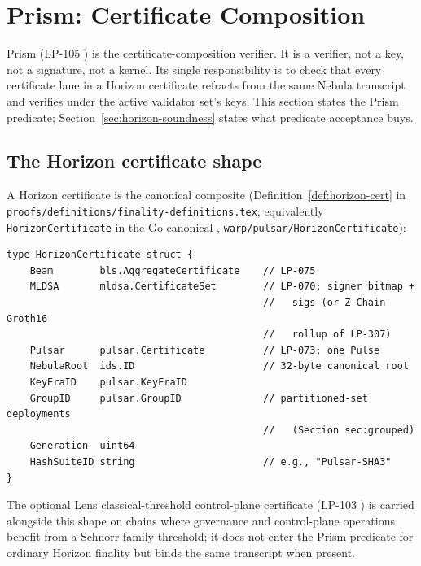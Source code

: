 \section{Prism: Certificate Composition}
\label{sec:prism-composition}

Prism (LP-105 \cite{lp105}) is the certificate-composition verifier. It is a verifier, not a key, not a signature, not a kernel. Its single responsibility is to check that every certificate lane in a Horizon certificate refracts from the same Nebula transcript and verifies under the active validator set's keys. This section states the Prism predicate; Section~\ref{sec:horizon-soundness} states what predicate acceptance buys.

\subsection{The Horizon certificate shape}

A Horizon certificate is the canonical composite (Definition~\ref{def:horizon-cert} in \texttt{proofs/definitions/finality-definitions.tex}; equivalently \texttt{HorizonCertificate} in the Go canonical \cite{consensusgo}, \texttt{warp/pulsar/HorizonCertificate}):

\begin{verbatim}
type HorizonCertificate struct {
    Beam        bls.AggregateCertificate    // LP-075
    MLDSA       mldsa.CertificateSet        // LP-070; signer bitmap +
                                            //   sigs (or Z-Chain Groth16
                                            //   rollup of LP-307)
    Pulsar      pulsar.Certificate          // LP-073; one Pulse
    NebulaRoot  ids.ID                      // 32-byte canonical root
    KeyEraID    pulsar.KeyEraID
    GroupID     pulsar.GroupID              // partitioned-set deployments
                                            //   (Section sec:grouped)
    Generation  uint64
    HashSuiteID string                      // e.g., "Pulsar-SHA3"
}
\end{verbatim}

The optional Lens classical-threshold control-plane certificate (LP-103 \cite{lp103}) is carried alongside this shape on chains where governance and control-plane operations benefit from a Schnorr-family threshold; it does not enter the Prism predicate for ordinary Horizon finality but binds the same transcript when present.

